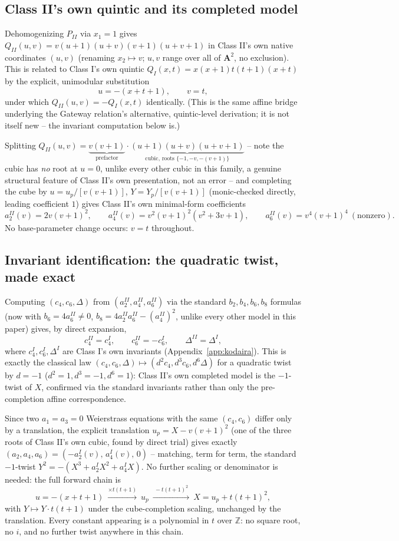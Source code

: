 \documentclass[11pt]{amsart}
\theoremstyle{definition}
\newcommand{\Z}{\mathbb{Z}}
\begin{document}
\subsection*{Class II's own quintic and its completed model}
Dehomogenizing $P_{II}$ via $x_1{=}1$ gives $Q_{II}(u,v)=v(u{+}1)(u{+}v)(v{+}1)(u{+}v{+}1)$ in Class II's own native coordinates $(u,v)$ (renaming $x_2\mapsto v$; $u,v$ range over all of $\mathbf A^2$, no exclusion). This is related to Class I's own quintic $Q_I(x,t)=x(x{+}1)t(t{+}1)(x{+}t)$ by the explicit, unimodular substitution
\[
u=-(x{+}t{+}1),\qquad v=t,
\]
under which $Q_{II}(u,v)=-Q_I(x,t)$ identically. (This is the same affine bridge underlying the Gateway relation's alternative, quintic-level derivation; it is not itself new -- the invariant computation below is.)

Splitting $Q_{II}(u,v)=\underbrace{v(v{+}1)}_{\text{prefactor}}\cdot\underbrace{(u{+}1)(u{+}v)(u{+}v{+}1)}_{\text{cubic, roots }\{-1,-v,-(v+1)\}}$ -- note the cubic has \emph{no} root at $u=0$, unlike every other cubic in this family, a genuine structural feature of Class II's own presentation, not an error -- and completing the cube by $u=u_p/[v(v{+}1)]$, $Y=Y_p/[v(v{+}1)]$ (monic-checked directly, leading coefficient $1$) gives Class II's own minimal-form coefficients
\[
a_2^{II}(v)=2v(v{+}1)^2,\qquad a_4^{II}(v)=v^2(v{+}1)^2(v^2{+}3v{+}1),\qquad a_6^{II}(v)=v^4(v{+}1)^4\ (\text{nonzero}).
\]
No base-parameter change occurs: $v=t$ throughout.

\subsection*{Invariant identification: the quadratic twist, made exact}
Computing $(c_4,c_6,\Delta)$ from $(a_2^{II},a_4^{II},a_6^{II})$ via the standard $b_2,b_4,b_6,b_8$ formulas (now with $b_6=4a_6^{II}\ne0$, $b_8=4a_2^{II}a_6^{II}-(a_4^{II})^2$, unlike every other model in this paper) gives, by direct expansion,
\[
c_4^{II}=c_4^{I},\qquad c_6^{II}=-c_6^{I},\qquad \Delta^{II}=\Delta^{I},
\]
where $c_4^I,c_6^I,\Delta^I$ are Class I's own invariants (Appendix~\ref{app:kodaira}). This is exactly the classical law $(c_4,c_6,\Delta)\mapsto(d^2c_4,d^3c_6,d^6\Delta)$ for a quadratic twist by $d=-1$ ($d^2{=}1,d^3{=}{-}1,d^6{=}1$): Class II's own completed model is the $-1$-twist of $X$, confirmed via the standard invariants rather than only the pre-completion affine correspondence.

Since two $a_1{=}a_3{=}0$ Weierstrass equations with the same $(c_4,c_6)$ differ only by a translation, the explicit translation $u_p=X-v(v{+}1)^2$ (one of the three roots of Class II's own cubic, found by direct trial) gives exactly $(a_2,a_4,a_6)=(-a_2^I(v),\,a_4^I(v),\,0)$ -- matching, term for term, the standard $-1$-twist $Y^2=-(X^3+a_2^IX^2+a_4^IX)$. No further scaling or denominator is needed: the full forward chain is
\[
u=-(x{+}t{+}1)\ \xrightarrow{\times t(t+1)}\ u_p\ \xrightarrow{\ -t(t{+}1)^2\ }\ X=u_p+t(t{+}1)^2,
\]
with $Y\mapsto Y\cdot t(t{+}1)$ under the cube-completion scaling, unchanged by the translation. Every constant appearing is a polynomial in $t$ over $\Z$: no square root, no $i$, and no further twist anywhere in this chain.
\end{document}
